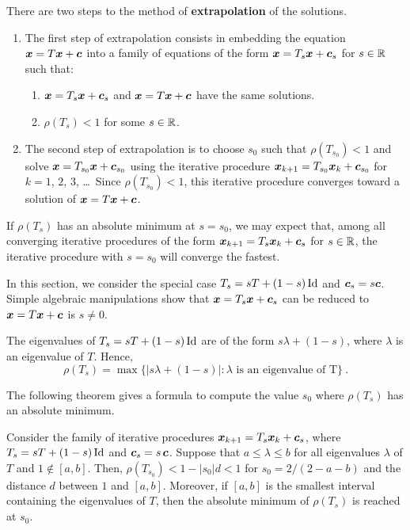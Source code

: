 There are two steps to the method of
{\bfseries extrapolation} of the solutions.

\begin{enumerate}
\item The first step of extrapolation consists in embedding the
equation
$\bm{x} = T\bm{x} + \bm{c}$ into a family of equations of the form
$\bm{x} = T_s \bm{x} + \bm{c}_s$ for $s\in \mathbb{R}$ such that: 
\begin{enumerate}
\item $\bm{x} = T_s \bm{x} + \bm{c}_s$ and
$\bm{x} = T\bm{x} + \bm{c}$ have the same solutions.
\item $\rho(T_s)<1$ for some $s\in \mathbb{R}$.
\end{enumerate}
\item The second step of extrapolation is to choose $s_0$ such
that $\rho(T_{s_0})<1$ and solve
$\bm{x} = T_{s_0} \bm{x} + \bm{c}_{s_0}$ using the
iterative procedure
$\bm{x}_{k+1} = T_{s_0} \bm{x}_{k} + \bm{c}_{s_0}$
for $k=1$, $2$, $3$, \ldots\  Since $\rho(T_{s_0})<1$, this iterative procedure
converges toward a solution of $\bm{x} = T\bm{x} + \bm{c}$.
\end{enumerate}

If $\rho(T_s)$ has an absolute minimum at $s = s_0$, we may expect
that, among all converging iterative procedures of the form
$\displaystyle \bm{x}_{k+1} = T_s \bm{x}_{k} + \bm{c}_s$
for $s\in \mathbb{R}$, the iterative procedure with $s=s_0$ will converge the
fastest.

In this section, we consider the special case $T_s = sT + (1-s)\operatorname{Id}$
and $\bm{c}_s = s\bm{c}$.  Simple algebraic manipulations show that
$\bm{x} = T_s\bm{x} + \bm{c}_s$ can be reduced to
$\bm{x} = T\bm{x} + \bm{c}$ is $s\neq 0$.

The eigenvalues of $T_s = sT + (1-s)\operatorname{Id}$ are of the form
$s\lambda + (1-s)$, where $\lambda$ is an eigenvalue of $T$.  Hence,
\[
\rho(T_s) = \max\{ |s\lambda + (1-s)| : \lambda
\text{ is an eigenvalue of T}\} \ .
\]

The following theorem gives a formula to compute the value $s_0$ where
$\rho(T_s)$ has an absolute minimum.

\begin{theorem}
Consider the family of iterative procedures
$\bm{x}_{k+1} = T_s \bm{x}_{k} + \bm{c}_s$, where
$T_s = sT + (1-s)\operatorname{Id}$ and $\bm{c}_s = s\,\bm{c}$.  Suppose that
$a\leq \lambda \leq b$ for all eigenvalues $\lambda$ of $T$ and
$1 \not\in [a,b]$.  Then,
$\rho(T_{s_0}) < 1 - |s_0|d < 1$
for $s_0 = 2/(2-a-b)$ and the distance $d$ between $1$ and $[a,b]$.
Moreover, if $[a,b]$ is the smallest interval containing the
eigenvalues of $T$, then the absolute minimum of $\rho(T_s)$ is
reached at $s_0$.
\end{theorem}


